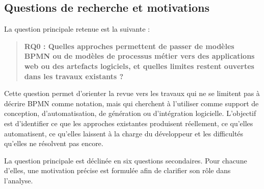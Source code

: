 
\subsection{Questions de recherche et motivations}

La question principale retenue est la suivante :

\begin{quote}
\textbf{RQ0 : Quelles approches permettent de passer de modèles BPMN ou de modèles de processus métier vers des applications web ou des artefacts logiciels, et quelles limites restent ouvertes dans les travaux existants ?}
\end{quote}

Cette question permet d'orienter la revue vers les travaux qui ne se limitent pas à décrire BPMN comme notation, mais qui cherchent à l'utiliser comme support de conception, d'automatisation, de génération ou d'intégration logicielle. L'objectif est d'identifier ce que les approches existantes produisent réellement, ce qu'elles automatisent, ce qu'elles laissent à la charge du développeur et les difficultés qu'elles ne résolvent pas encore.

La question principale est déclinée en six questions secondaires. Pour chacune d'elles, une motivation précise est formulée afin de clarifier son rôle dans l'analyse.


